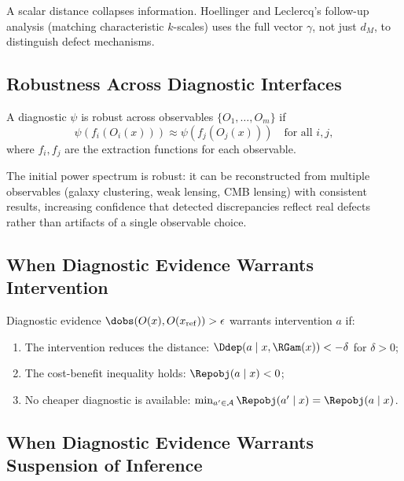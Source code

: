 A scalar distance collapses information. Hoellinger and Leclercq's follow-up analysis (matching characteristic $k$-scales) uses the full vector $\gamma$, not just $d_M$, to distinguish defect mechanisms.


\subsection{Robustness Across Diagnostic Interfaces}

\begin{definition}
A diagnostic $\psi$ is robust across observables $\{O_1, \ldots, O_m\}$ if
\[
\psi(f_i(O_i(x))) \approx \psi(f_j(O_j(x))) \quad \text{for all } i, j,
\]
where $f_i, f_j$ are the extraction functions for each observable.
\end{definition}

The initial power spectrum is robust: it can be reconstructed from multiple observables (galaxy clustering, weak lensing, CMB lensing) with consistent results, increasing confidence that detected discrepancies reflect real defects rather than artifacts of a single observable choice.


\subsection{When Diagnostic Evidence Warrants Intervention}

\begin{theorem}
Diagnostic evidence $\dobs(O(x), O(x_{\mathrm{ref}})) > \epsilon$ warrants intervention $a$ if:
\begin{enumerate}
\item The intervention reduces the distance: $\Ddep(a \mid x, \RGam(x)) < -\delta$ for $\delta > 0$;
\item The cost-benefit inequality holds: $\Repobj(a \mid x) < 0$;
\item No cheaper diagnostic is available: $\min_{a' \in \mathcal{A}} \Repobj(a' \mid x) = \Repobj(a \mid x)$.
\end{enumerate}
\end{theorem}


\subsection{When Diagnostic Evidence Warrants Suspension of Inference}


